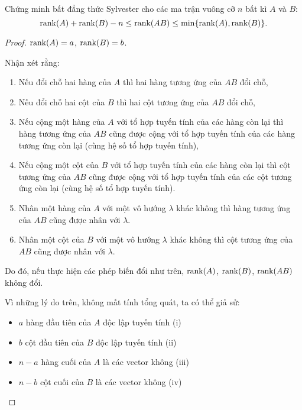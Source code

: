 \documentclass[class=nhvh-linear-algebra,crop=false]{standalone}
\begin{document}
\begin{exercise}
    \par Chứng minh bất đẳng thức Sylvester cho các ma trận vuông cỡ $n$ bất kì $A$ và $B$:
    \[
        \text{rank}(A) + \text{rank}(B) - n \le \text{rank}(AB) \le \min\{ \text{rank}(A), \text{rank}(B) \}.
    \]
\end{exercise}

\begin{proof}
    \par $\text{rank}(A) = a$, $\text{rank}(B) = b$.
    \par Nhận xét rằng:
    \begin{enumerate}[label = (\roman*)]
        \item Nếu đổi chỗ hai hàng của $A$ thì hai hàng tương ứng của $AB$ đổi chỗ,
        \item Nếu đổi chỗ hai cột của $B$ thì hai cột tương ứng của $AB$ đổi chỗ,
        \item Nếu cộng một hàng của $A$ với tổ hợp tuyến tính của các hàng còn lại thì hàng tương ứng của $AB$ cũng được cộng với tổ hợp tuyến tính của các hàng tương ứng còn lại (cùng hệ số tổ hợp tuyến tính),
        \item Nếu cộng một cột của $B$ với tổ hợp tuyến tính của các hàng còn lại thì cột tương ứng của $AB$ cũng được cộng với tổ hợp tuyến tính của các cột tương ứng còn lại (cùng hệ số tổ hợp tuyến tính).
        \item Nhân một hàng của $A$ với một vô hướng $\lambda$ khác không thì hàng tương ứng của $AB$ cũng được nhân với $\lambda$.
        \item Nhân một cột của $B$ với một vô hướng $\lambda$ khác không thì cột tương ứng của $AB$ cũng được nhân với $\lambda$.
    \end{enumerate}
    \par Do đó, nếu thực hiện các phép biến đổi như trên, $\text{rank}(A)$, $\text{rank}(B)$, $\text{rank}(AB)$ không đổi.
    \bigskip
    \par Vì những lý do trên, không mất tính tổng quát, ta có thể giả sử:
    \begin{itemize}
        \item $a$ hàng đầu tiên của $A$ độc lập tuyến tính (i)
        \item $b$ cột đầu tiên của $B$ độc lập tuyến tính (ii)
        \item $n - a$ hàng cuối của $A$ là các vector không (iii)
        \item $n - b$ cột cuối của $B$ là các vector không (iv)
    \end{itemize}

\end{proof}
\end{document}
